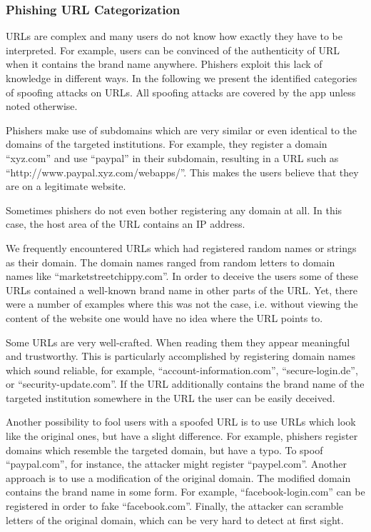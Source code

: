 \subsubsection{Phishing URL Categorization}
\label{s:url_categories}
URLs are complex and many users do not know how exactly they have to be interpreted.
 For example, users can be convinced of the authenticity of URL when it contains the brand name anywhere.
 Phishers exploit this lack of knowledge in different ways.
 In the following we present the identified categories of spoofing attacks on URLs. 
 All spoofing attacks are covered by the app unless noted otherwise.

\begin{description}[leftmargin=0cm]
	\item[Subdomains:] Phishers make use of subdomains which are very similar or even identical to the domains of the targeted institutions.
 For example, they register a domain  ``xyz.com'' and use ``paypal'' in their subdomain, resulting in a URL such as ``http://www.paypal.xyz.com/webapps/''.
 This makes the users believe that they are on a legitimate website.

	\item[IP Addresses:] Sometimes phishers do not even bother registering any domain at all.
 In this case, the host area of the URL contains an IP address.

	\item[Nonsense Domains:] We frequently encountered URLs which had registered random names or strings as their domain.
 The domain names ranged from random letters to domain names like ``marketstreetchippy.com''. In order to deceive the users some of these URLs contained a well-known brand name in other parts of the URL.
Yet, there were a number of examples where this was not the case, i.e. without viewing the content of the website one would have no idea where the URL points to.

	\item[Trustworthy, but Unrelated Domains:] Some URLs are very well-crafted.
 When reading them they appear meaningful and trustworthy.
 This is particularly accomplished by registering domain names which sound reliable, for example, ``account-information.com'', ``secure-login.de'', or ``security-update.com''. If the URL additionally contains the brand name of the targeted institution somewhere in the URL the user can be easily deceived.

	\item[Similar and Deceptive Domains:] Another possibility to fool users with a spoofed URL is to use URLs which look like the original ones, but have a slight difference.
 For example, phishers register domains which resemble the targeted domain, but have a typo.
 To spoof ``paypal.com'', for instance, the attacker might register ``paypel.com''. Another approach is to use a modification of the original domain.
 The modified domain contains the brand name in some form.
 For example, ``facebook-login.com'' can be registered in order to fake ``facebook.com''. Finally, the attacker can scramble letters of the original domain, which can be very hard to detect at first sight.


\end{description}

